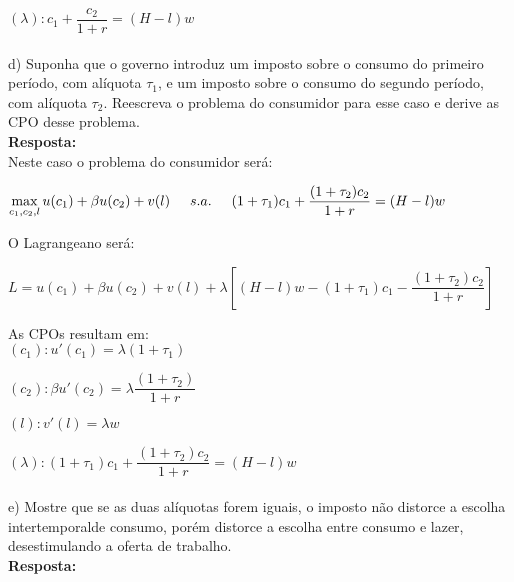 \begin{enumerate}
{$ (\lambda): c_1 + \dfrac{c_2}{1+r} = (H - l)w$}\\



\paragraph{} d) Suponha que o governo introduz um imposto sobre o consumo do primeiro período, com alíquota {$\tau_1$}, e um imposto sobre o consumo do segundo período, com alíquota {$\tau_2$}. Reescreva o problema do consumidor para esse caso e derive as CPO desse problema.\\

\textbf{Resposta:}\\

Neste caso o problema do consumidor será:

\begin{center}
{$ \displaystyle\max_{c_1, c_2, l} u(c_1) + \beta u(c_2) + v(l) \hspace{0,5cm} s. a. \hspace{0,5cm} (1+ \tau_1) c_1 + \dfrac{ (1 + \tau_2) c_2}{1+r} = (H - l)w$}
\end{center}


O Lagrangeano será:

\begin{center}
{$ L = u (c_1) + \beta u (c_2) + v(l) + \lambda \left[ (H - l)w - (1 + \tau_1) c_1 - \dfrac{(1 + \tau_2) c_2}{1+r} \right]$}
\end{center}

As CPOs resultam em:\\

{$(c_1): u'(c_1) = \lambda (1 + \tau_1)$}

{$(c_2): \beta u'(c_2) = \lambda \dfrac{(1 + \tau_2)}{1+r}$}

{$(l): v'(l) =  \lambda w$}

{$ (\lambda): (1 + \tau_1) c_1 + \dfrac{(1 + \tau_2) c_2}{1+r} = (H - l)w$}\\

\paragraph{} e) Mostre que se as duas alíquotas forem iguais, o imposto não distorce a escolha intertemporalde consumo, porém distorce a escolha entre consumo e lazer, desestimulando
a oferta de trabalho.\\

\textbf{Resposta:}\\


\end{enumerate}
